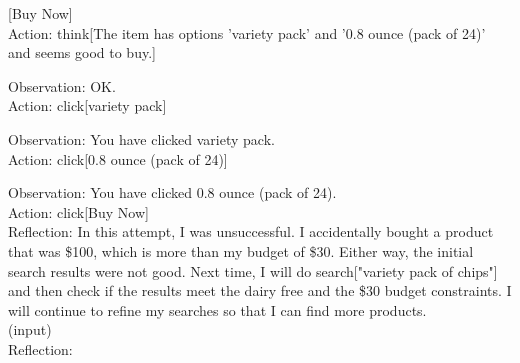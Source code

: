 \documentclass{article} \usepackage{iclr2024_conference,times}
\begin{document}
[Buy Now]
\\

Action: think[The item has options 'variety pack' and '0.8 ounce (pack of 24)' and seems good to buy.]

Observation: OK.
\\

Action: click[variety pack]

Observation: You have clicked variety pack.
\\

Action: click[0.8 ounce (pack of 24)]

Observation: You have clicked 0.8 ounce (pack of 24).
\\

Action: click[Buy Now]
\\

Reflection: In this attempt, I was unsuccessful. I accidentally bought a product that was \$100, which is more than my budget of \$30. Either way, the initial search results were not good. Next time, I will do search["variety pack of chips"] and then check if the results meet the dairy free and the \$30 budget constraints. I will continue to refine my searches so that I can find more products.
\\

(input)
\\

Reflection:













 
\end{document}

